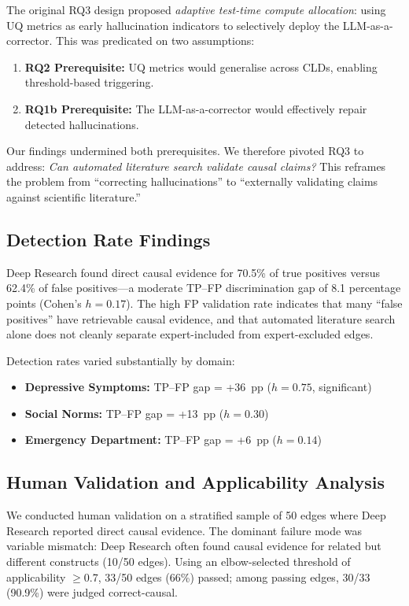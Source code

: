 The original RQ3 design proposed \textit{adaptive test-time compute allocation}: using UQ metrics as early hallucination indicators to selectively deploy the LLM-as-a-corrector. This was predicated on two assumptions:
\begin{enumerate}[noitemsep]
    \item \textbf{RQ2 Prerequisite:} UQ metrics would generalise across CLDs, enabling threshold-based triggering.
    \item \textbf{RQ1b Prerequisite:} The LLM-as-a-corrector would effectively repair detected hallucinations.
\end{enumerate}
Our findings undermined both prerequisites. We therefore pivoted RQ3 to address: \textit{Can automated literature search validate causal claims?} This reframes the problem from ``correcting hallucinations'' to ``externally validating claims against scientific literature.''

\subsection{Detection Rate Findings}

Deep Research found direct causal evidence for 70.5\% of true positives versus 62.4\% of false positives---a moderate TP--FP discrimination gap of 8.1 percentage points (Cohen's $h=0.17$). The high FP validation rate indicates that many ``false positives'' have retrievable causal evidence, and that automated literature search alone does not cleanly separate expert-included from expert-excluded edges.

Detection rates varied substantially by domain:
\begin{itemize}[noitemsep]
    \item \textbf{Depressive Symptoms:} TP--FP gap = +36~pp ($h=0.75$, significant)
    \item \textbf{Social Norms:} TP--FP gap = +13~pp ($h=0.30$)
    \item \textbf{Emergency Department:} TP--FP gap = +6~pp ($h=0.14$)
\end{itemize}

\subsection{Human Validation and Applicability Analysis}

We conducted human validation on a stratified sample of 50 edges where Deep Research reported direct causal evidence. The dominant failure mode was variable mismatch: Deep Research often found causal evidence for related but different constructs (10/50 edges). Using an elbow-selected threshold of applicability $\geq$0.7, 33/50 edges (66\%) passed; among passing edges, 30/33 (90.9\%) were judged correct-causal.

